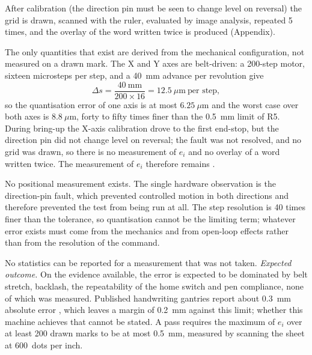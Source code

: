 
            After calibration (the direction pin must be seen to change level on reversal) the grid is drawn, scanned with the ruler, evaluated by image analysis, repeated 5 times, and the overlay of the word written twice is produced (Appendix).


            The only quantities that exist are derived from the mechanical configuration, not measured on a drawn mark.
            The X and Y axes are belt-driven: a 200-step motor, sixteen microsteps per step, and a 40~mm advance per revolution give
            \begin{equation}
            \label{eq:res-step}
            \Delta s=\frac{40\ \mathrm{mm}}{200\times16}=12.5\ \mu\mathrm{m}\ \text{per step},
            \end{equation}
            so the quantisation error of one axis is at most $6.25~\mu$m and the worst case over both axes is $8.8~\mu$m, forty to fifty times finer than the 0.5~mm limit of R5.
            During bring-up the X-axis calibration drove to the first end-stop, but the direction pin did not change level on reversal; the fault was not resolved, and no grid was drawn, so there is no measurement of $e_i$ and no overlay of a word written twice.
            The measurement of $e_i$ therefore remains \nym{}.


            No positional measurement exists.
            The single hardware observation is the direction-pin fault, which prevented controlled motion in both directions and therefore prevented the test from being run at all.
            The step resolution is 40 times finer than the tolerance, so quantisation cannot be the limiting term; whatever error exists must come from the mechanics and from open-loop effects rather than from the resolution of the command.


            No statistics can be reported for a measurement that was not taken.
            \emph{Expected outcome.}
            On the evidence available, the error is expected to be dominated by belt stretch, backlash, the repeatability of the home switch and pen compliance, none of which was measured.
            Published handwriting gantries report about 0.3~mm absolute error \cite{huang2024}, which leaves a margin of 0.2~mm against this limit; whether this machine achieves that cannot be stated.
            A pass requires the maximum of $e_i$ over at least 200 drawn marks to be at most 0.5~mm, measured by scanning the sheet at 600~dots per inch.


